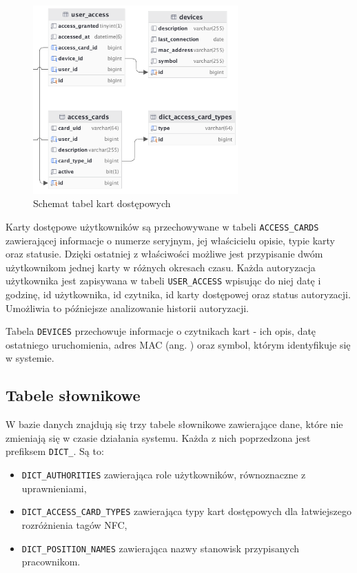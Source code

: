 \begin{figure}[H]
    \centering
    \includegraphics[width=0.7\textwidth]{graf/acTable.png}
    \caption{Schemat tabel kart dostępowych}
    \label{fig:accessCardsTable}
\end{figure}

Karty dostępowe użytkowników są przechowywane w tabeli \texttt{ACCESS\_CARDS} zawierającej informacje o numerze seryjnym, jej właścicielu opisie, typie karty oraz statusie. Dzięki ostatniej z właściwości możliwe jest przypisanie dwóm użytkownikom jednej karty w różnych okresach czasu. Każda autoryzacja użytkownika jest zapisywana w tabeli \texttt{USER\_ACCESS} wpisując do niej datę i godzinę, id użytkownika, id czytnika, id karty dostępowej oraz status autoryzacji. Umożliwia to późniejsze analizowanie historii autoryzacji.

Tabela \texttt{DEVICES} przechowuje informacje o czytnikach kart - ich opis, datę ostatniego uruchomienia, adres MAC (ang. ) oraz symbol, którym identyfikuje się w systemie.

\subsection{Tabele słownikowe}

W bazie danych znajdują się trzy tabele słownikowe zawierające dane, które nie zmieniają się w czasie działania systemu. Każda z nich poprzedzona jest prefiksem \texttt{DICT\_}. Są to:

\begin{itemize}
    \item \texttt{DICT\_AUTHORITIES} zawierająca role użytkowników, równoznaczne z uprawnieniami,
    \item \texttt{DICT\_ACCESS\_CARD\_TYPES} zawierająca typy kart dostępowych dla łatwiejszego rozróżnienia tagów NFC,
    \item \texttt{DICT\_POSITION\_NAMES} zawierająca nazwy stanowisk przypisanych pracownikom.
\end{itemize}

